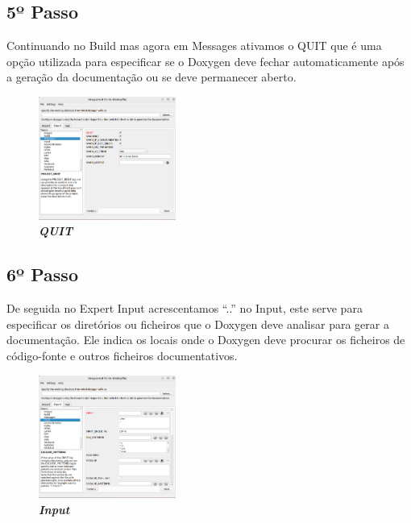 \documentclass[a4wide]{report}
\begin{document}
{{{{\subsection{5º Passo}
\Large
Continuando no Build mas agora em Messages ativamos o QUIT que é uma opção utilizada para especificar se o Doxygen deve fechar automaticamente após a geração da documentação ou se deve permanecer aberto.
\begin{figure}[hbt]
    \centering
    \includegraphics[width=0.40\textwidth]{imagem_5.png}
    \caption{\textbf{\textit{QUIT}}\label{fig:imagem}}
\end{figure}

\subsection{6º Passo}
\Large
De seguida no Expert Input acrescentamos “..” no Input, este serve para especificar os diretórios ou ficheiros que o Doxygen deve analisar para gerar a documentação. Ele indica os locais onde o Doxygen deve procurar os ficheiros de código-fonte e outros ficheiros documentativos.
\begin{figure}[hbt]
    \centering
    \includegraphics[width=0.40\textwidth]{imagem_6.png}
    \caption{\textbf{\textit{Input}}\label{fig:imagem}}
\end{figure}

\newpage
}}}}
\end{document}
